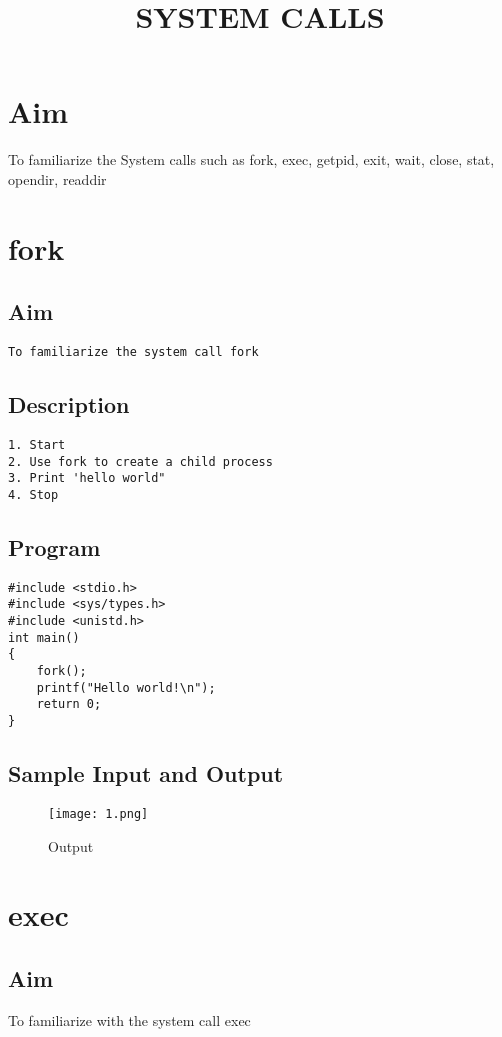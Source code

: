 \documentclass{article}
\title{\textbf {SYSTEM CALLS}}
\date{\vspace{-5ex}}
\begin{document}
\maketitle
\thispagestyle{first}
\pagestyle{third}
\section*{\Large Aim}
To familiarize the System calls such as fork, exec, getpid, exit, wait,
close, stat, opendir, readdir
\section{\Large fork}
\subsection{Aim}
\begin{Verbatim}[tabsize = 4]
To familiarize the system call fork
\end{Verbatim}
\subsection{Description}
\begin{Verbatim}[tabsize = 4]
1. Start
2. Use fork to create a child process
3. Print 'hello world"
4. Stop
\end{Verbatim}

\subsection{Program}
\begin{Verbatim}[tabsize = 4]
#include <stdio.h>
#include <sys/types.h>
#include <unistd.h>
int main()
{
	fork();
	printf("Hello world!\n");
	return 0;
}

\end{Verbatim}

\subsection{Sample Input and Output}
\begin{figure}[H]
    \centering
    \texttt{[image: 1.png]}
    \caption{Output}
    \label{fig:my_label2}
\end{figure}
\section{\Large exec}
\subsection{Aim}
To familiarize with the system call exec
\end{document}
